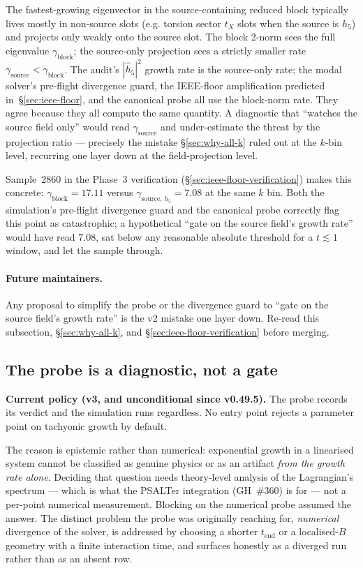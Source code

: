 The fastest-growing eigenvector in the source-containing reduced
block typically lives mostly in non-source slots (e.g. torsion sector
$t_X$ slots when the source is $h_5$) and projects only weakly onto
the source slot. The block 2-norm sees the full eigenvalue
$\gamma_\mathrm{block}$; the source-only projection sees a strictly
smaller rate $\gamma_\mathrm{source} < \gamma_\mathrm{block}$. The
audit's $|\hat h_5|^2$ growth rate is the source-only rate; the
modal solver's pre-flight divergence guard, the IEEE-floor
amplification predicted in~\S\ref{sec:ieee-floor}, and the canonical
probe all use the block-norm rate. They agree because they all
compute the same quantity. A diagnostic that ``watches the source
field only'' would read $\gamma_\mathrm{source}$ and under-estimate
the threat by the projection ratio --- precisely the mistake
\S\ref{sec:why-all-k} ruled out at the $k$-bin level, recurring one
layer down at the field-projection level.

Sample~2860 in the Phase~3 verification (\S\ref{sec:ieee-floor-verification})
makes this concrete: $\gamma_\mathrm{block} = 17.11$ versus
$\gamma_{\mathrm{source},\,h_5} = 7.08$ at the same $k$ bin. Both
the simulation's pre-flight divergence guard and the canonical
probe correctly flag this point as catastrophic; a hypothetical
``gate on the source field's growth rate'' would have read $7.08$,
sat below any reasonable absolute threshold for a $t \lesssim 1$
window, and let the sample through.

\paragraph{Future maintainers.} Any proposal to simplify the probe
or the divergence guard to ``gate on the source field's growth
rate'' is the v2 mistake one layer down. Re-read this subsection,
\S\ref{sec:why-all-k}, and \S\ref{sec:ieee-floor-verification}
before merging.

\subsection{The probe is a diagnostic, not a gate}
\label{sec:probe-is-diagnostic}

\textbf{Current policy (v3, and unconditional since v0.49.5).}  The
probe records its verdict and the simulation runs regardless.  No entry
point rejects a parameter point on tachyonic growth by default.

The reason is epistemic rather than numerical: exponential growth in a
linearised system cannot be classified as genuine physics or as an
artifact \emph{from the growth rate alone}.  Deciding that question
needs theory-level analysis of the Lagrangian's spectrum --- which is
what the PSALTer integration (GH~\#360) is for --- not a per-point
numerical measurement.  Blocking on the numerical probe assumed the
answer.  The distinct problem the probe was originally reaching for,
\emph{numerical} divergence of the solver, is addressed by choosing a
shorter $t_{\text{end}}$ or a localised-$B$ geometry with a finite
interaction time, and surfaces honestly as a diverged run rather than
as an absent row.

